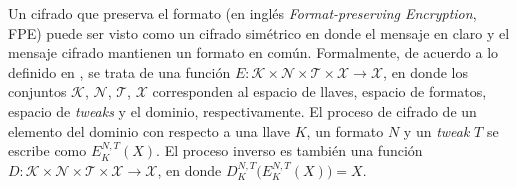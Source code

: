
Un cifrado que preserva el formato (en inglés \textit{Format-preserving
Encryption}, FPE) puede ser visto como un cifrado simétrico en donde el mensaje
en claro y el mensaje cifrado mantienen un formato en común. Formalmente, de
acuerdo a lo definido en \cite{DBLP:conf/sacrypt/BellareRRS09}, se trata de una
función $ E: \mathcal{K} \times \mathcal{N} \times \mathcal{T} \times
\mathcal{X} \rightarrow \mathcal{X} $, en donde los conjuntos $ \mathcal{K} $, $
\mathcal{N} $, $ \mathcal{T} $, $ \mathcal{X} $ corresponden al espacio de
llaves, espacio de formatos, espacio de \textit{tweaks} y el dominio,
respectivamente. El proceso de cifrado de un elemento del dominio con respecto a
una llave $ K $, un formato $ N $ y un \textit{tweak} $ T $ se escribe como  $
E_K^{N,T}(X) $. El proceso inverso es también una función $ D: \mathcal{K}
\times \mathcal{N} \times \mathcal{T} \times \mathcal{X} \rightarrow \mathcal{X}
$, en donde $ D_K^{N,T}\big( E_K^{N,T}(X) \big) = X $.






